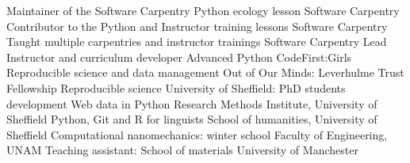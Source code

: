 \begin{cvpress}
 \cvpres
 {Maintainer of the Software Carpentry Python ecology lesson}
 {Software Carpentry}
 {}
 \cvpres
 {Contributor to the Python and Instructor training lessons}
 {Software Carpentry}
 {}
 \cvpres
 {Taught multiple carpentries and instructor trainings}
 {Software Carpentry}
 {}
 \cvpres
 {Lead Instructor and curriculum developer Advanced Python}
 {CodeFirst:Girls}
 {}
 \cvpres
 {Reproducible science and data management}
 {Out of Our Minds: Leverhulme Trust Fellowship}
 {}
 \cvpres
 {Reproducible science}
 {University of Sheffield: PhD students development}
 {}
 \cvpres
 {Web data in Python}
 {Research Methods Institute, University of Sheffield}
 {}
 \cvpres
 {Python, Git and R for linguists}
 {School of humanities, University of Sheffield}
 {}
 \cvpres
 {Computational nanomechanics: winter school}
 {Faculty of Engineering, UNAM}
 {}
 \cvpres
 {Teaching assistant: School of materials}
 {University of Manchester}
 {}
\end{cvpress}